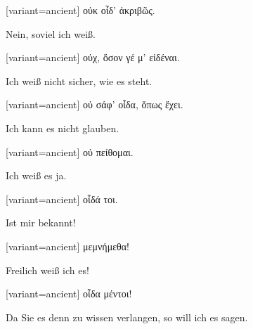 \switchcolumn

\begin{greek}[variant=ancient]%
οὐκ οἶδ' ἀκριβῶς.

\end{greek}%
\switchcolumn*

Nein, soviel ich weiß. 

\switchcolumn

\begin{greek}[variant=ancient]%
οὐχ, ὅσον γέ μ' εἰδέναι.

\end{greek}%
\switchcolumn*

Ich weiß nicht sicher, wie es steht. 

\switchcolumn

\begin{greek}[variant=ancient]%
οὐ σάφ' οἶδα, ὅπως ἔχει.

\end{greek}%
\switchcolumn*

Ich kann es nicht glauben. 

\switchcolumn

\begin{greek}[variant=ancient]%
οὐ πείθομαι.

\end{greek}%
\switchcolumn*

Ich weiß es ja. 

\switchcolumn

\begin{greek}[variant=ancient]%
οἶδά τοι.

\end{greek}%
\switchcolumn*

Ist mir bekannt! 

\switchcolumn

\begin{greek}[variant=ancient]%
μεμνήμεθα!

\end{greek}%
\switchcolumn*

Freilich weiß ich es! 

\switchcolumn

\begin{greek}[variant=ancient]%
οἶδα μέντοι!

\end{greek}%
\switchcolumn*

Da Sie es denn zu wissen verlangen, so will ich es sagen. 

\switchcolumn

